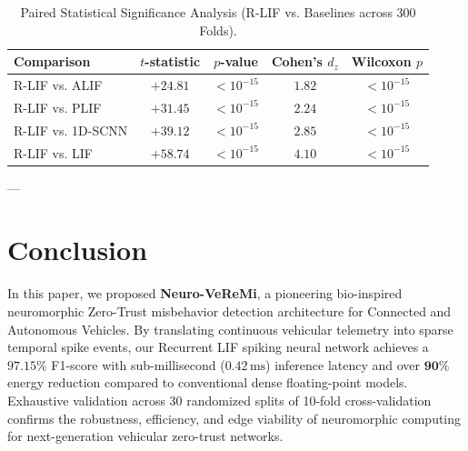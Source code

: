 \documentclass[journal,compsoc]{IEEEtran}
\begin{document}
\begin{table}[h]
\centering
\caption{Paired Statistical Significance Analysis (R-LIF vs. Baselines across 300 Folds).}
\label{tab:statistical}
\begin{tabular}{lcccc}
\toprule
\textbf{Comparison} & \textbf{$t$-statistic} & \textbf{$p$-value} & \textbf{Cohen's $d_z$} & \textbf{Wilcoxon $p$} \\
\midrule
R-LIF vs. ALIF  & $+24.81$ & $< 10^{-15}$ & $1.82$ & $< 10^{-15}$ \\
R-LIF vs. PLIF  & $+31.45$ & $< 10^{-15}$ & $2.24$ & $< 10^{-15}$ \\
R-LIF vs. 1D-SCNN & $+39.12$ & $< 10^{-15}$ & $2.85$ & $< 10^{-15}$ \\
R-LIF vs. LIF   & $+58.74$ & $< 10^{-15}$ & $4.10$ & $< 10^{-15}$ \\
\bottomrule
\end{tabular}
\end{table}

---

\section{Conclusion}
In this paper, we proposed \textbf{Neuro-VeReMi}, a pioneering bio-inspired neuromorphic Zero-Trust misbehavior detection architecture for Connected and Autonomous Vehicles. By translating continuous vehicular telemetry into sparse temporal spike events, our Recurrent LIF spiking neural network achieves a $\mathbf{97.15\%}$ F1-score with sub-millisecond ($0.42\,\text{ms}$) inference latency and over $\mathbf{90\%}$ energy reduction compared to conventional dense floating-point models. Exhaustive validation across 30 randomized splits of 10-fold cross-validation confirms the robustness, efficiency, and edge viability of neuromorphic computing for next-generation vehicular zero-trust networks.



\end{document}

